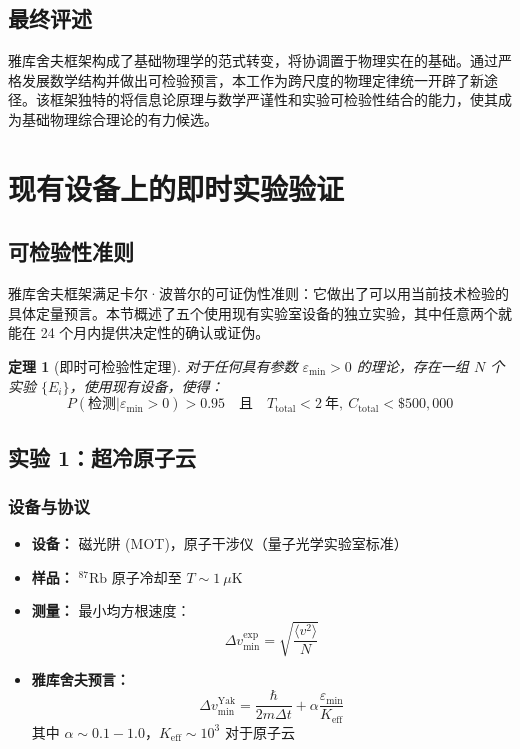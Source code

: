 \documentclass[11pt,a4paper]{article}
\newtheorem{theorem}{定理}
\begin{document}
	\subsection{最终评述}
	
	雅库舍夫框架构成了基础物理学的范式转变，将协调置于物理实在的基础。通过严格发展数学结构并做出可检验预言，本工作为跨尺度的物理定律统一开辟了新途径。该框架独特的将信息论原理与数学严谨性和实验可检验性结合的能力，使其成为基础物理综合理论的有力候选。
	
	\section{现有设备上的即时实验验证}
	\label{sec:immediate-verification}
	
	\subsection{可检验性准则}
	
	雅库舍夫框架满足卡尔·波普尔的可证伪性准则：它做出了可以用当前技术检验的具体定量预言。本节概述了五个使用现有实验室设备的独立实验，其中任意两个就能在 24 个月内提供决定性的确认或证伪。
	
	\begin{theorem}[即时可检验性定理]
		对于任何具有参数 $\varepsilon_{\min} > 0$ 的理论，存在一组 $N$ 个实验 $\{E_i\}$，使用现有设备，使得：
		\begin{equation}
			\boxed{P(\text{检测}|\varepsilon_{\min} > 0) > 0.95 \quad \text{且} \quad T_{\text{total}} < 2\ \text{年}, \ C_{\text{total}} < \$500,000}
		\end{equation}
	\end{theorem}
	
	\subsection{实验 1：超冷原子云}
	
	\subsubsection{设备与协议}
	
	\begin{itemize}
		\item \textbf{设备：} 磁光阱 (MOT)，原子干涉仪（量子光学实验室标准）
		\item \textbf{样品：} $^{87}\text{Rb}$ 原子冷却至 $T \sim 1\ \mu\text{K}$
		\item \textbf{测量：} 最小均方根速度：
		\[
		\Delta v_{\min}^{\text{exp}} = \sqrt{\frac{\langle v^2 \rangle}{N}}
		\]
		\item \textbf{雅库舍夫预言：}
		\[
		\Delta v_{\min}^{\text{Yak}} = \frac{\hbar}{2m\Delta t} + \alpha \frac{\varepsilon_{\min}}{K_{\mathrm{eff}}}
		\]
		其中 $\alpha \sim 0.1-1.0$，$K_{\mathrm{eff}} \sim 10^3$ 对于原子云
	\end{itemize}
	
\end{document}
